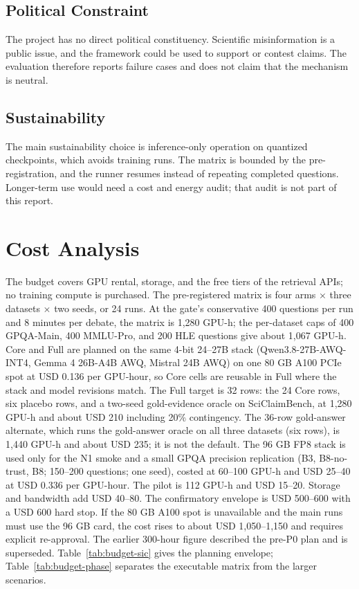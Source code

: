 \subsection{Political Constraint}

The project has no direct political constituency. Scientific misinformation is a public issue, and the framework could be used to support or contest claims. The evaluation therefore reports failure cases and does not claim that the mechanism is neutral.

\subsection{Sustainability}

The main sustainability choice is inference-only operation on quantized checkpoints, which avoids training runs. The matrix is bounded by the pre-registration, and the runner resumes instead of repeating completed questions. Longer-term use would need a cost and energy audit; that audit is not part of this report.


\section{Cost Analysis}

The budget covers GPU rental, storage, and the free tiers of the retrieval APIs; no training compute is purchased. The pre-registered matrix is four arms $\times$ three datasets $\times$ two seeds, or 24 runs. At the gate's conservative 400 questions per run and 8 minutes per debate, the matrix is 1,280 GPU-h; the per-dataset caps of 400 GPQA-Main, 400 MMLU-Pro, and 200 HLE questions give about 1,067 GPU-h. Core and Full are planned on the same 4-bit 24--27B stack (Qwen3.8-27B-AWQ-INT4, Gemma 4 26B-A4B AWQ, Mistral 24B AWQ) on one 80 GB A100 PCIe spot at USD 0.136 per GPU-hour, so Core cells are reusable in Full where the stack and model revisions match. The Full target is 32 rows: the 24 Core rows, six placebo rows, and a two-seed gold-evidence oracle on SciClaimBench, at 1,280 GPU-h and about USD 210 including 20\% contingency. The 36-row gold-answer alternate, which runs the gold-answer oracle on all three datasets (six rows), is 1,440 GPU-h and about USD 235; it is not the default. The 96 GB FP8 stack is used only for the N1 smoke and a small GPQA precision replication (B3, B8-no-trust, B8; 150--200 questions; one seed), costed at 60--100 GPU-h and USD 25--40 at USD 0.336 per GPU-hour. The pilot is 112 GPU-h and USD 15--20. Storage and bandwidth add USD 40--80. The confirmatory envelope is USD 500--600 with a USD 600 hard stop. If the 80 GB A100 spot is unavailable and the main runs must use the 96 GB card, the cost rises to about USD 1,050--1,150 and requires explicit re-approval. The earlier 300-hour figure described the pre-P0 plan and is superseded. Table~\ref{tab:budget-sic} gives the planning envelope; Table~\ref{tab:budget-phase} separates the executable matrix from the larger scenarios.

